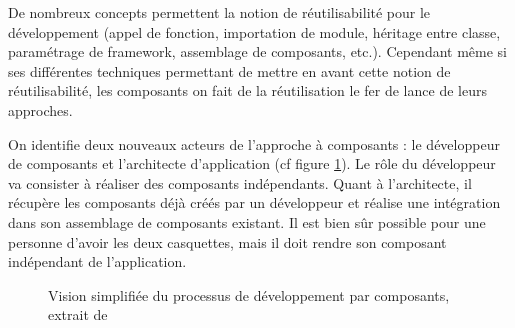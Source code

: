   De nombreux concepts permettent la notion de réutilisabilité pour le développement (appel de fonction, importation de module, héritage entre classe, paramétrage de framework, assemblage de composants, etc.). Cependant même si ses différentes techniques permettant de mettre en avant cette notion de réutilisabilité, les composants on fait de la réutilisation le fer de lance de leurs approches.\\\par  
    
  On identifie deux nouveaux acteurs de l'approche à composants \cite{fabresse2007decoupage} : le dévelop\-peur de composants et l’architecte d’application (cf figure \ref{fig:reusecomponent}). Le rôle du développeur va consister à réaliser des composants indépendants. Quant à l'architecte, il récupère les composants déjà créés par un développeur et réalise une intégration dans son assemblage de composants existant. Il est bien sûr possible pour une personne d'avoir les deux casquettes, mais il doit rendre son composant indépendant de l'application. \\\par 
      
\begin{figure}[!t]
\centering
{}
\caption{Vision simplifiée du processus de développement par composants, extrait de \cite{fabresse2007decoupage}}
\label{fig:reusecomponent}
\end{figure}
  

